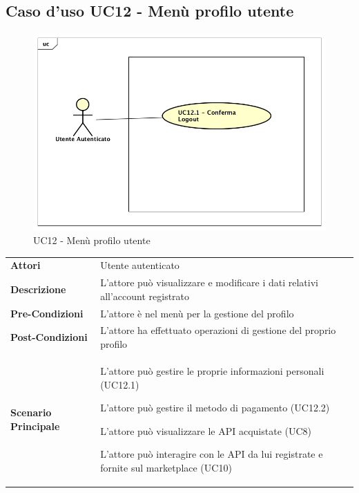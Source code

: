 \newpage
\subsection{Caso d'uso UC12 - Menù profilo utente}
\label{UC12}

\begin{figure}[ht]
	\centering
	\includegraphics[scale=0.45]{UML/UC12.png}
	\caption{UC12 - Menù profilo utente}
\end{figure}
\FloatBarrier
\begin{longtable}{ l | p{11cm}}
	\hline
	\rowcolor{Gray}
	 \multicolumn{2}{c}{UC12 - Menù profilo utente} \\
	 \hline
	 \textbf{Attori} & Utente autenticato  \\
	\textbf{Descrizione} & L’attore può visualizzare e modificare i dati relativi all'account registrato \\
	\textbf{Pre-Condizioni} & L’attore è nel menù per la gestione del profilo \\
	\textbf{Post-Condizioni} & L’attore ha effettuato operazioni di gestione del proprio profilo \\
	\textbf{Scenario Principale} & 
	\begin{enumerate*}[label=(\arabic*.),itemjoin={\newline}]
		\item L'attore può gestire le proprie informazioni personali (UC12.1)
		\item L'attore può gestire il metodo di pagamento (UC12.2)
		\item L'attore può visualizzare le API acquistate (UC8)
		\item L'attore può interagire con le API da lui registrate e fornite sul marketplace (UC10)
	\end{enumerate*}\\
\end{longtable}

